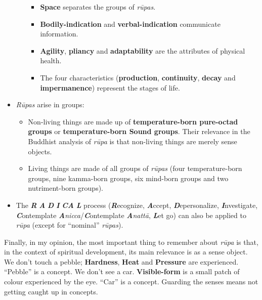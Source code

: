 \begin{itemize}
\begin{itemize}
\begin{itemize}

\item \textbf{Space} separates the groups of \textit{rūpas}.

\item \textbf{Bodily-indication} and \textbf{verbal-indication} communicate information.

\item \textbf{Agility}, \textbf{pliancy} and \textbf{adaptability} are the attributes of physical health.

\item The four characteristics (\textbf{production}, \textbf{continuity}, \textbf{decay} and \textbf{impermanence}) represent the stages of life.

\end{itemize}

\end{itemize}

\item \textit{Rūpas} arise in groups:

\begin{itemize}

\item Non-living things are made up of \textbf{temperature-born pure-octad groups} or \textbf{temperature-born \textbf{Sound} groups}. Their relevance in the Buddhist analysis of \textit{rūpa} is that non-living things are merely sense objects.

\item Living things are made of all groups of \textit{rūpas} (four temperature-born groups, nine kamma-born groups, six mind-born groups and two nutriment-born groups).

\end{itemize}

\item The \textbf{\textit{R}} \textbf{\textit{A}} \textbf{\textit{D}} \textbf{\textit{I}} \textbf{\textit{CA}} \textbf{\textit{L}} process (\textbf{\textit{R}}ecognize, \textbf{\textit{A}}ccept, \textbf{\textit{D}}epersonalize, \textbf{\textit{I}}nvestigate, \textbf{\textit{C}}ontemplate \textbf{\textit{A}}\textit{nicca}/\textbf{\textit{C}}ontemplate \textbf{\textit{A}}\textit{nattā}, \textbf{\textit{L}}et go) can also be applied to \textit{rūpa} (except for “nominal” \textit{rūpas}).

\end{itemize}

Finally, in my opinion, the most important thing to remember about \textit{rūpa} is that, in the context of spiritual development, its main relevance is as a sense object. We don’t touch a pebble; \textbf{Hardness}, \textbf{Heat} and \textbf{Pressure} are experienced. “Pebble” is a concept. We don’t see a car. \textbf{Visible-form} is a small patch of colour experienced by the eye. “Car” is a concept. Guarding the senses means not getting caught up in concepts.

